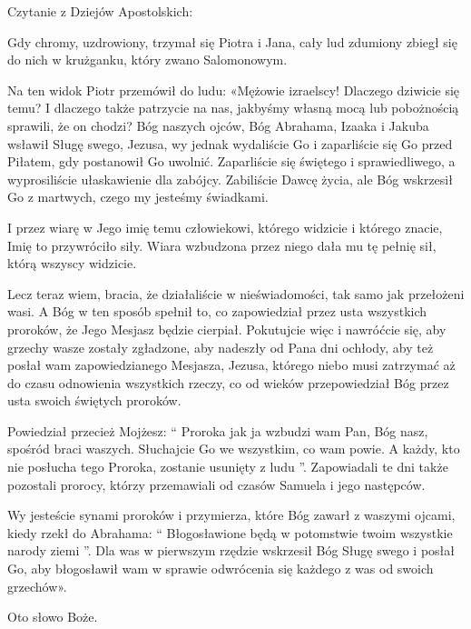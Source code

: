 \indent Czytanie z Dziejów Apostolskich:

Gdy chromy, uzdrowiony, trzymał się Piotra i Jana, cały lud zdumiony zbiegł się do nich w krużganku, który zwano Salomonowym.

Na ten widok Piotr przemówił do ludu: «Mężowie izraelscy! Dlaczego dziwicie się temu? I dlaczego także patrzycie na nas, jakbyśmy własną mocą lub pobożnością sprawili, że on chodzi? Bóg naszych ojców, Bóg Abrahama, Izaaka i Jakuba wsławił Sługę swego, Jezusa, wy jednak wydaliście Go i zaparliście się Go przed Piłatem, gdy postanowił Go uwolnić. Zaparliście się świętego i sprawiedliwego, a wyprosiliście ułaskawienie dla zabójcy. Zabiliście Dawcę życia, ale Bóg wskrzesił Go z martwych, czego my jesteśmy świadkami.

I przez wiarę w Jego imię temu człowiekowi, którego widzicie i którego znacie, Imię to przywróciło siły. Wiara wzbudzona przez niego dała mu tę pełnię sił, którą wszyscy widzicie.

Lecz teraz wiem, bracia, że działaliście w nieświadomości, tak samo jak przełożeni wasi. A Bóg w ten sposób spełnił to, co zapowiedział przez usta wszystkich proroków, że Jego Mesjasz będzie cierpiał. Pokutujcie więc i nawróćcie się, aby grzechy wasze zostały zgładzone, aby nadeszły od Pana dni ochłody, aby też posłał wam zapowiedzianego Mesjasza, Jezusa, którego niebo musi zatrzymać aż do czasu odnowienia wszystkich rzeczy, co od wieków przepowiedział Bóg przez usta swoich świętych proroków.

Powiedział przecież Mojżesz: “ Proroka jak ja wzbudzi wam Pan, Bóg nasz, spośród braci waszych. Słuchajcie Go we wszystkim, co wam powie. A każdy, kto nie posłucha tego Proroka, zostanie usunięty z ludu ”. Zapowiadali te dni także pozostali prorocy, którzy przemawiali od czasów Samuela i jego następców.

Wy jesteście synami proroków i przymierza, które Bóg zawarł z waszymi ojcami, kiedy rzekł do Abrahama: “ Błogosławione będą w potomstwie twoim wszystkie narody ziemi ”. Dla was w pierwszym rzędzie wskrzesił Bóg Sługę swego i posłał Go, aby błogosławił wam w sprawie odwrócenia się każdego z was od swoich grzechów».

Oto słowo Boże.